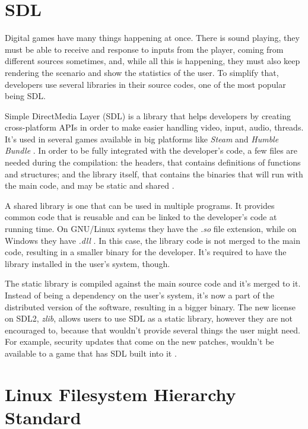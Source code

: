 \section{SDL}
\label {sec:sdl}

Digital games have many things happening at once. There is sound playing, they must be able to receive and response to inputs from the player, coming from different sources sometimes, and, while all this is happening, they must also keep rendering the scenario and show the statistics of the user. To simplify that, developers use several libraries in their source codes, one of the most popular being SDL.

Simple DirectMedia Layer (SDL) is a library that helps developers by creating cross-platform APIs in order to make easier handling video, input, audio, threads. It's used in several games available in big platforms like \textit{Steam} and \textit{Humble Bundle} \cite{sdl2017}. In order to be fully integrated with the developer's code, a few files are needed during the compilation: the headers, that contains definitions of functions and structures; and the library itself, that contains the binaries that will run with the main code, and may be static and shared \cite{mitchell2013sdl}.

A shared library is one that can be used in multiple programs. It provides common code that is reusable and can be linked to the developer's code at running time. On GNU/Linux systems they have the \textit{.so} file extension, while on Windows they have \textit{.dll} \cite{campbell2009algorithms}. In this case, the library code is not merged to the main code, resulting in a smaller binary for the developer. It's required to have the library installed in the user's system, though.

The static library is compiled against the main source code and it's merged to it. Instead of being a dependency on the user's system, it's now a part of the distributed version of the software, resulting in a bigger binary. The new license on SDL2, \textit{zlib}\footnotemark, allows users to use SDL as a static library, however they are not encouraged to, because that wouldn't provide several things the user might need. For example, security updates that come on the new patches, wouldn't be available to a game that has SDL built into it \cite{ryangordon2017}.



\section{Linux Filesystem Hierarchy Standard}
\label {sec:fhs}

